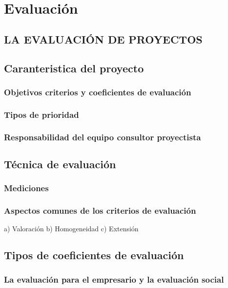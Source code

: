 \documentclass[crop=false]{standalone}
\begin{document}
\section{Evaluación}


\subsection{ LA EVALUACIÓN DE PROYECTOS}

\subsection{Caranteristica del proyecto}

\subsubsection{Objetivos criterios y coeficientes de evaluación}

\subsubsection{Tipos de prioridad}
\subsubsection{Responsabilidad del equipo consultor proyectista}

\subsection{Técnica de evaluación}

\subsubsection{Mediciones}

\subsubsection{Aspectos comunes de los criterios de evaluación}

a) Valoración
b) Homogeneidad
c) Extensión


\subsection{Tipos de coeficientes de evaluación}


\subsubsection{La evaluación para el empresario y la evaluación social}
\end{document}
